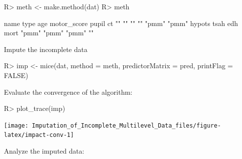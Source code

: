 \documentclass[
]{jss}
\begin{document}
\begin{CodeChunk}
\begin{CodeInput}
R> meth <- make.method(dat)
R> meth
\end{CodeInput}
\begin{CodeOutput}
       name        type         age motor_score       pupil          ct 
         ""          ""          ""          ""       "pmm"       "pmm" 
     hypots        tsah         edh        mort 
      "pmm"       "pmm"       "pmm"          "" 
\end{CodeOutput}
\end{CodeChunk}

Impute the incomplete data

\begin{CodeChunk}
\begin{CodeInput}
R> imp <- mice(dat, method = meth, predictorMatrix = pred, printFlag = FALSE)
\end{CodeInput}
\end{CodeChunk}

Evaluate the convergence of the algorithm:

\begin{CodeChunk}
\begin{CodeInput}
R> plot_trace(imp)
\end{CodeInput}


\begin{center}\texttt{[image: Imputation\_of\_Incomplete\_Multilevel\_Data\_files/figure-latex/impact-conv-1]} \end{center}

\end{CodeChunk}

Analyze the imputed data:
\end{document}
